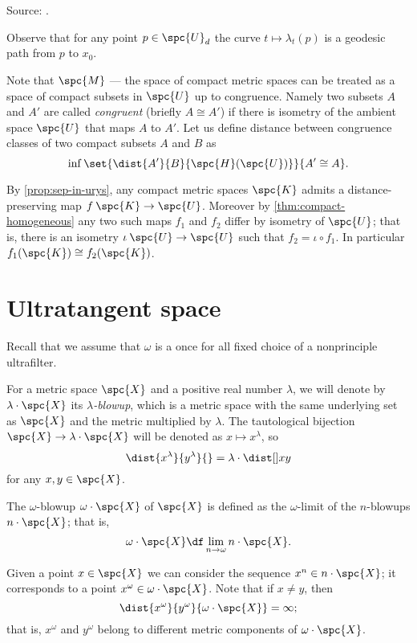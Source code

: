 Source: \cite[(d) on page 82]{gromov-2007}.

Observe that for any point $p\in \spc{U}_d$ the curve $t\mapsto \lambda_t(p)$ is a geodesic path from $p$ to $x_0$.








Note that $\spc{M}$ --- the space of compact metric spaces can be treated as a space of compact subsets in $\spc{U}$ up to congruence.
Namely two subsets $A$ and $A'$ are called \emph{congruent} (briefly $A\cong A'$) if there is isometry of the ambient space $\spc{U}$ that maps $A$ to $A'$.
Let us define distance between congruence classes of two compact subsets $A$ and $B$ as 
\[\inf\set{\dist{A'}{B}{\spc{H}(\spc{U})}}{A'\cong A}.\]


By \ref{prop:sep-in-urys}, any compact metric spaces $\spc{K}$ admits a distance-preserving map $f\:\spc{K}\to\spc{U}$.
Moreover by \ref{thm:compact-homogeneous} any two such maps $f_1$ and $f_2$ differ by isometry of $\spc{U}$;
that is, there is an isometry $\iota\:\spc{U}\to\spc{U}$ such that $f_2=\iota\circ f_1$.
In particular $f_1(\spc{K})\cong f_2(\spc{K})$.










\section{Ultratangent space} 

Recall that we assume that $\omega$ is a once for all fixed choice of a nonprinciple ultrafilter.

For a metric space $\spc{X}$ and a positive real number $\lambda$,
we will denote by $\lambda\cdot\spc{X}$ its \emph{$\lambda$-blowup},
which is a metric space with the same underlying set as $\spc{X}$ and the metric multiplied by $\lambda$.
The tautological bijection $\spc{X}\to \lambda\cdot\spc{X}$ will be denoted as $x\mapsto x^\lambda$, 
so 
\[\dist{x^\lambda}{y^\lambda}{}
=
\lambda\cdot\dist[{{}}]{x}{y}{}\] 
for any $x,y\in \spc{X}$.

The $\omega$-blowup $\omega\cdot\spc{X}$ of $\spc{X}$ is defined as the $\omega$-limit
of the $n$-blowups $n\cdot\spc{X}$; that is,
\[\omega\cdot\spc{X}
\df
\lim_{n\to\omega} n\cdot\spc{X}.\]

Given a point $x\in \spc{X}$ we can consider the sequence $x^n\in n\cdot\spc{X}$;
it corresponds to a point $x^\omega\in \omega\cdot\spc{X}$.
Note that if $x\ne y$, then 
\[\dist{x^\omega}{y^\omega}{\omega\cdot\spc{X}}=\infty;\]
that is, 
$x^\omega$ and $y^\omega$ 
belong to different metric components of $\omega\cdot\spc{X}$.

